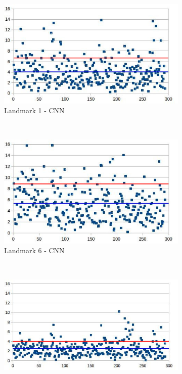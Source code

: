 \documentclass[10pt]{article}
\begin{document}
\begin{figure}[htbp]
   
    \begin{subfigure}[t]{0.25\textwidth}
        \centering
        \includegraphics[scale=.35]{images/lm1_cnn_2}
        \caption{\small{Landmark 1 - CNN}}
        \label{figsub11}
    \end{subfigure}%
    ~ 
    \begin{subfigure}[t]{0.25\textwidth}
        \centering
        \includegraphics[scale=.34]{images/lm6_cnn_2}
        \caption{\small{Landmark 6 - CNN}}
        \label{figsub22}
    \end{subfigure}~\\
    \begin{subfigure}[t]{0.25\textwidth}
        \centering
        \includegraphics[scale=.33]{images/lm1_finetuning_2}

\end{subfigure}
\end{figure}
\end{document}

